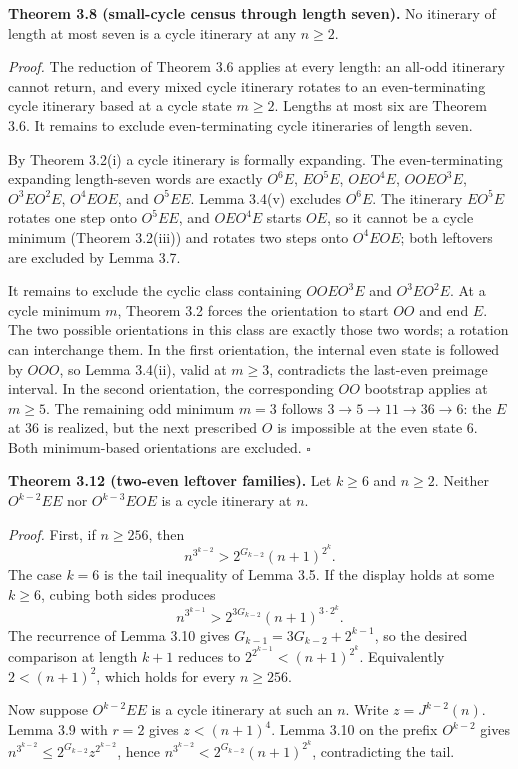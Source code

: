 \documentclass[12pt]{article}
\begin{document}
\textbf{Theorem 3.8 (small-cycle census through length seven).} No
itinerary of length at most seven is a cycle itinerary at any
\(n\ge 2\).

\emph{Proof.} The reduction of Theorem 3.6 applies at every length: an
all-odd itinerary cannot return, and every mixed cycle itinerary rotates
to an even-terminating cycle itinerary based at a cycle state
\(m\ge 2\). Lengths at most six are Theorem 3.6. It remains to exclude
even-terminating cycle itineraries of length seven.

By Theorem 3.2(i) a cycle itinerary is formally expanding. The
even-terminating expanding length-seven words are exactly \(O^6E\),
\(EO^5E\), \(OEO^4E\), \(OOEO^3E\), \(O^3EO^2E\), \(O^4EOE\), and
\(O^5EE\). Lemma 3.4(v) excludes \(O^6E\). The itinerary \(EO^5E\)
rotates one step onto \(O^5EE\), and \(OEO^4E\) starts \(OE\), so it
cannot be a cycle minimum (Theorem 3.2(iii)) and rotates two steps onto
\(O^4EOE\); both leftovers are excluded by Lemma 3.7.

It remains to exclude the cyclic class containing \(OOEO^3E\) and
\(O^3EO^2E\). At a cycle minimum \(m\), Theorem 3.2 forces the
orientation to start \(OO\) and end \(E\). The two possible orientations
in this class are exactly those two words; a rotation can interchange
them. In the first orientation, the internal even state is followed by
\(OOO\), so Lemma 3.4(ii), valid at \(m\ge3\), contradicts the last-even
preimage interval. In the second orientation, the corresponding \(OO\)
bootstrap applies at \(m\ge5\). The remaining odd minimum \(m=3\)
follows \(3\to5\to11\to36\to6\): the \(E\) at \(36\) is realized, but
the next prescribed \(O\) is impossible at the even state \(6\). Both
minimum-based orientations are excluded. \(\square\)

\textbf{Theorem 3.12 (two-even leftover families).} Let \(k\ge 6\) and
\(n\ge 2\). Neither \(O^{k-2}EE\) nor \(O^{k-3}EOE\) is a cycle
itinerary at \(n\).

\emph{Proof.} First, if \(n\ge 256\), then \[
n^{3^{k-2}}>2^{G_{k-2}}(n+1)^{2^k}.
\] The case \(k=6\) is the tail inequality of Lemma 3.5. If the display
holds at some \(k\ge 6\), cubing both sides produces \[
n^{3^{k-1}}
>
2^{3G_{k-2}}(n+1)^{3\cdot 2^k}.
\] The recurrence of Lemma 3.10 gives \(G_{k-1}=3G_{k-2}+2^{k-1}\), so
the desired comparison at length \(k+1\) reduces to
\(2^{2^{k-1}}<(n+1)^{2^k}\). Equivalently \(2<(n+1)^2\), which holds for
every \(n\ge 256\).

Now suppose \(O^{k-2}EE\) is a cycle itinerary at such an \(n\). Write
\(z=J^{k-2}(n)\). Lemma 3.9 with \(r=2\) gives \(z<(n+1)^4\). Lemma 3.10
on the prefix \(O^{k-2}\) gives
\(n^{3^{k-2}}\le 2^{G_{k-2}}z^{2^{k-2}}\), hence
\(n^{3^{k-2}}<2^{G_{k-2}}(n+1)^{2^k}\), contradicting the tail.
\end{document}
